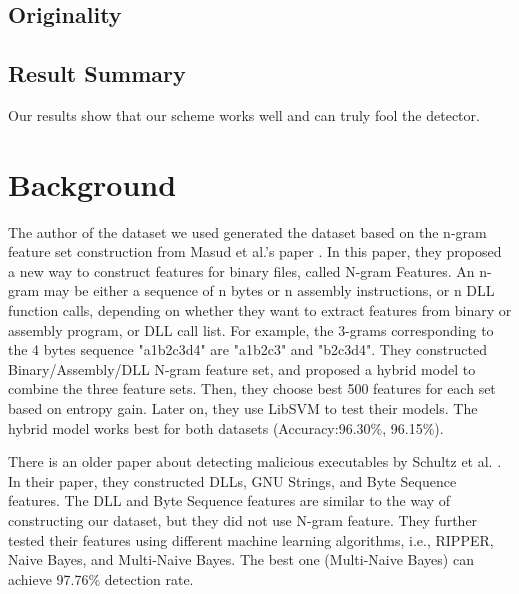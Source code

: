 \documentclass[11pt]{article}
\begin{document}
\subsection{Originality}

\subsection{Result Summary}
Our results show that our scheme works well and can truly fool the detector.

\section{Background}
The author of the dataset we used generated the dataset based on the n-gram feature set construction from Masud et al.'s paper \cite{masud2007hybrid}. In this paper, they proposed a new way to construct features for binary files, called N-gram Features. An n-gram may be either a sequence of n bytes or n assembly instructions, or n DLL function calls, depending on whether they want to extract features from binary or assembly program, or DLL call list. For example, the 3-grams corresponding to the 4 bytes sequence "a1b2c3d4" are "a1b2c3" and "b2c3d4". They constructed Binary/Assembly/DLL N-gram feature set, and proposed a hybrid model to combine the three feature sets. Then, they choose best 500 features for each set based on entropy gain. Later on, they use LibSVM to test their models. The hybrid model works best for both datasets (Accuracy:96.30\%, 96.15\%).

There is an older paper about detecting malicious executables by Schultz et al. \cite{schultz2001data}. In their paper, they constructed DLLs, GNU Strings, and Byte Sequence features. The DLL and Byte Sequence features are similar to the way of constructing our dataset, but they did not use N-gram feature. They further tested their features using different machine learning algorithms, i.e., RIPPER, Naive Bayes, and Multi-Naive Bayes. The best one (Multi-Naive Bayes) can achieve 97.76\% detection rate.


\end{document}
